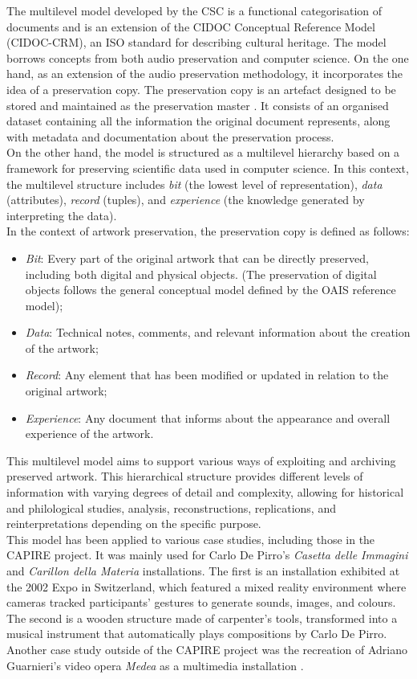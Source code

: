 The multilevel model developed by the CSC is a functional categorisation of documents and is an extension of the CIDOC Conceptual Reference Model (CIDOC-CRM), an ISO standard for describing cultural heritage. The model borrows concepts from both audio preservation and computer science. On the one hand, as an extension of the audio preservation methodology, it incorporates the idea of a preservation copy. The preservation copy is an artefact designed to be stored and maintained as the preservation master \cite{miliano1999iasa}. It consists of an organised dataset containing all the information the original document represents, along with metadata and documentation about the preservation process.\\
On the other hand, the model is structured as a multilevel hierarchy based on a framework for preserving scientific data used in computer science. In this context, the multilevel structure includes \textit{bit} (the lowest level of representation), \textit{data} (attributes), \textit{record} (tuples), and \textit{experience} (the knowledge generated by interpreting the data).\\
In the context of artwork preservation, the preservation copy is defined as follows:
\begin{itemize}
    \item \textit{Bit}: Every part of the original artwork that can be directly preserved, including both digital and physical objects. (The preservation of digital objects follows the general conceptual model defined by the OAIS reference model);
    \item \textit{Data}: Technical notes, comments, and relevant information about the creation of the artwork;
    \item \textit{Record}: Any element that has been modified or updated in relation to the original artwork;
    \item \textit{Experience}: Any document that informs about the appearance and overall experience of the artwork.
\end{itemize}
This multilevel model aims to support various ways of exploiting and archiving preserved artwork. This hierarchical structure provides different levels of information with varying degrees of detail and complexity, allowing for historical and philological studies, analysis, reconstructions, replications, and reinterpretations depending on the specific purpose.\\
This model has been applied to various case studies, including those in the CAPIRE project. It was mainly used for Carlo De Pirro’s \textit{Casetta delle Immagini} and \textit{Carillon della Materia} installations. The first is an installation exhibited at the 2002 Expo in Switzerland, which featured a mixed reality environment where cameras tracked participants' gestures to generate sounds, images, and colours. The second is a wooden structure made of carpenter’s tools, transformed into a musical instrument that automatically plays compositions by Carlo De Pirro. Another case study outside of the CAPIRE project was the recreation of Adriano Guarnieri’s video opera \textit{Medea} as a multimedia installation \cite{bressan2009preserving, bressan2014challenge}.\\
